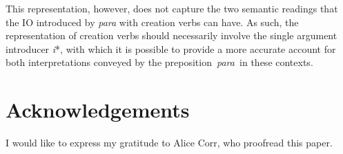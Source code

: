 \documentclass[output=paper,colorlinks,citecolor=brown,modfonts,nonflat]{langsci/langscibook}
\begin{document}
This representation, however, does not capture the two semantic readings that the IO introduced by \textit{para} with creation verbs can have. As such, the representation of creation verbs should necessarily involve the single argument introducer \textit{i}*, with which it is possible to provide a more accurate account for both interpretations conveyed by the preposition~\textit{para~}in these contexts.

\section*{Acknowledgements}
I would like to express my gratitude to Alice Corr, who proofread this paper.

\sloppy\printbibliography[heading=subbibliography,notkeyword=this]
\end{document}
